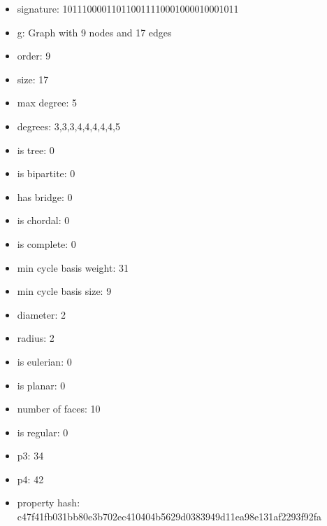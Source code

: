 \newpage
\begin{figure}
\end{figure}
\begin{itemize}
\item signature: 101110000110110011110001000010001011
\item g: Graph with 9 nodes and 17 edges
\item order: 9
\item size: 17
\item max degree: 5
\item degrees: 3,3,3,4,4,4,4,4,5
\item is tree: 0
\item is bipartite: 0
\item has bridge: 0
\item is chordal: 0
\item is complete: 0
\item min cycle basis weight: 31
\item min cycle basis size: 9
\item diameter: 2
\item radius: 2
\item is eulerian: 0
\item is planar: 0
\item number of faces: 10
\item is regular: 0
\item p3: 34
\item p4: 42
\item property hash: c47f41fb031bb80e3b702ec410404b5629d0383949d11ea98e131af2293f92fa
\end{itemize}
